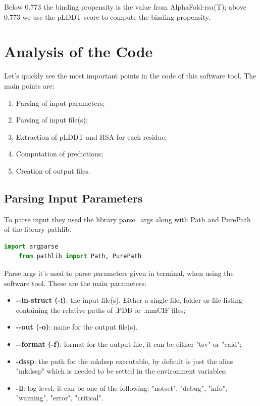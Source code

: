Below 0.773 the binding propensity is the value from AlphaFold-rsa(T); above 0.773 we use the pLDDT score to compute the binding propensity.

\section{Analysis of the Code}
Let's quickly see the most important points in the code of this software tool. The main points are: 
\begin{enumerate}

    \item Parsing of input parameters;
    \item Parsing of input file(s);
    \item Extraction of pLDDT and RSA for each residue;
    \item Computation of predictions;
    \item Creation of output files.
\end{enumerate}

\pagebreak

\subsection{Parsing Input Parameters}
To parse input they used the library parse\_args along with Path and PurePath of the library pathlib.

\begin{lstlisting}[language=Python, caption=import\ libraries\ parsing, label={code:parseargs}]
    import argparse
    from pathlib import Path, PurePath
\end{lstlisting}

Parse args it's used to parse parameters given in terminal, when using the software tool. These are the main parameters:
\begin{itemize}
    \item \textbf{-\vspace{0.1cm}-in-struct (-i)}: the input file(s). Either a single file, folder or file listing containing the relative paths of .PDB or .mmCIF files;
    \item \textbf{-\vspace{0.1cm}-out (-o)}: name for the output file(s).
    \item \textbf{-\vspace{0.1cm}-format (-f)}: format for the output file, it can be either "tsv" or "caid";
    \item \textbf{-dssp}: the path for the mkdssp executable, by default is just the alias "mkdssp" which is needed to be setted in the environment variables;
    \item \textbf{-ll}: log level, it can be one of the following: "notset", "debug", "info", "warning", "error", "critical".
\end{itemize}

